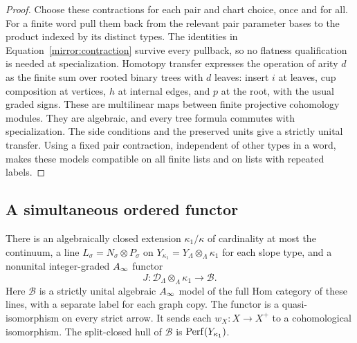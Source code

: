 \begin{proof}
Choose these contractions for each pair and chart choice, once and
for all.  For a finite word pull them back from the relevant pair
parameter bases to the product indexed by its distinct types.
The identities in Equation~\eqref{mirror:contraction} survive every
pullback, so no flatness qualification is needed at specialization.
Homotopy transfer expresses the operation of arity $d$ as the finite
sum over rooted binary trees with $d$ leaves: insert $i$ at leaves,
cup composition at vertices, $h$ at internal edges, and $p$ at the
root, with the usual graded signs.  These are multilinear maps
between finite projective cohomology modules.  They are algebraic,
and every tree formula commutes with specialization.  The side
conditions and the preserved units give a strictly unital transfer.
Using a fixed pair contraction, independent of other types in a
word, makes these models compatible on all finite lists and on
lists with repeated labels.
\end{proof}

\subsection{A simultaneous ordered functor}

\begin{proposition}
\label{mirror:simultaneous}
There is an algebraically closed extension $\kappa_1/\kappa$ of
cardinality at most the continuum, a line
$L_\sigma=N_\sigma\otimes P_\sigma$ on
$Y_{\kappa_1}=Y_\Lambda\otimes_\Lambda\kappa_1$ for each slope
type, and a nonunital integer-graded $A_\infty$ functor
\begin{equation}
 J:\mathcal D_\Lambda\otimes_\Lambda\kappa_1
             \longrightarrow\mathcal B.
 \label{mirror:simultaneous-functor}
\end{equation}
Here $\mathcal B$ is a strictly unital algebraic $A_\infty$ model of
the full Hom category of these lines, with a separate label for
each graph copy.  The functor is a quasi-isomorphism on every strict
arrow.  It sends each $w_X:X\to X^+$ to a cohomological
isomorphism.  The split-closed hull of $\mathcal B$ is
$\operatorname{Perf}(Y_{\kappa_1})$.
\end{proposition}

